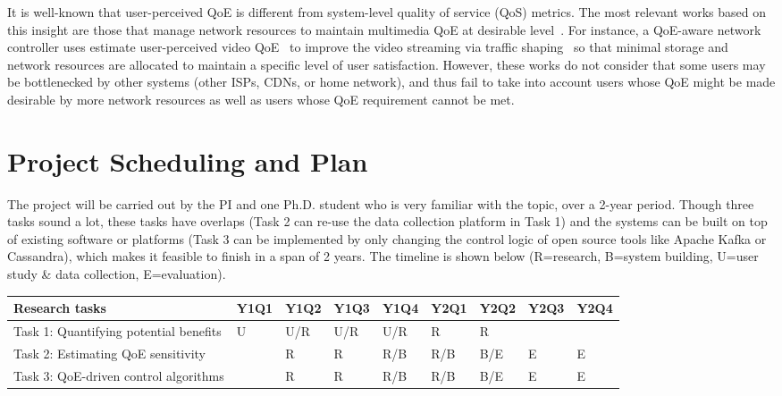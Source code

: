 It is well-known that user-perceived QoE is different from system-level quality of service (QoS) metrics. 
The most relevant works based on this insight are those that manage network resources to maintain multimedia QoE at desirable level~\cite{barakovic2013survey,hobfeld2012challenges,seufert2015survey,joseph2014nova}. 
For instance, a QoE-aware network controller uses estimate user-perceived video QoE~\cite{huysegems2012session} to improve the video streaming via traffic shaping~\cite{petrangeli2015network} so that minimal storage and network resources are allocated to maintain a specific level of user satisfaction.
However, these works do not consider that some users may be bottlenecked by other systems (other ISPs, CDNs, or home network), and thus fail to take into account users whose QoE might be made desirable by more network resources as well as users whose QoE requirement cannot be met.




\section{Project Scheduling and Plan}

The project will be carried out by the PI and one Ph.D. student who is very familiar with the topic, over a 2-year period.
Though three tasks sound a lot, these tasks have overlaps (\eg Task 2 can re-use the data collection platform in Task 1) and the systems can be built on top of existing software or platforms (\eg Task 3 can be implemented by only changing the control logic of open source tools like Apache Kafka or Cassandra), which makes it feasible to finish in a span of 2 years.
The timeline is shown below (R=research, B=system building, U=user study \& data collection, E=evaluation).
\begin{table}[h]
\footnotesize
\begin{tabular}{|l|l|l|l|l|l|l|l|l|}
\hline
Research tasks                           & Y1Q1 & Y1Q2 & Y1Q3 & Y1Q4 & Y2Q1 & Y2Q2 & Y2Q3 & Y2Q4 \\ \hline
Task 1: Quantifying potential benefits   & U    & U/R  & U/R  & U/R  &  R    &  R    &      &      \\ 
Task 2: Estimating QoE sensitivity &      & R    & R  & R/B  & R/B    & B/E    & E    & E    \\ 
Task 3: QoE-driven control algorithms    &    &   R    & R  & R/B  & R/B  & B/E  & E   &  E   \\ \hline
\end{tabular}
\end{table}


